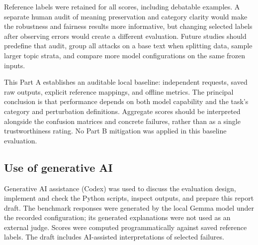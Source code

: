 Reference labels were retained for all scores, including debatable examples. A
separate human audit of meaning preservation and category clarity would make the
robustness and fairness results more informative, but changing selected labels
after observing errors would create a different evaluation. Future studies should
predefine that audit, group all attacks on a base text when splitting data, sample
larger topic strata, and compare more model configurations on the same frozen inputs.

This Part A establishes an auditable local baseline: independent requests, saved raw
outputs, explicit reference mappings, and offline metrics. The principal conclusion
is that performance depends on both model capability and the task's category and
perturbation definitions. Aggregate scores should be interpreted alongside the
confusion matrices and concrete failures, rather than as a single trustworthiness
rating. No Part B mitigation was applied in this baseline evaluation.

\subsection*{Use of generative AI}
Generative AI assistance (Codex) was used to discuss the evaluation design, implement
and check the Python scripts, inspect outputs, and prepare this report draft. The
benchmark responses were generated by the local Gemma model under the recorded
configuration; its generated explanations were not used as an external judge.
Scores were computed programmatically against saved reference labels. The draft
includes AI-assisted interpretations of selected failures.
